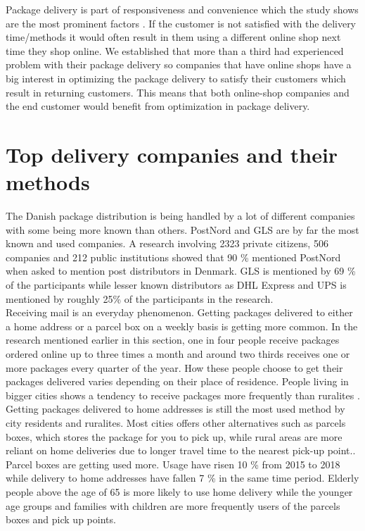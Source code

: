 \documentclass[12pt]{report}
\begin{document}
Package delivery is part of responsiveness and convenience which the study shows are the most prominent factors \cite{FDIHyearreport}. If the customer is not satisfied with the delivery time/methods it would often result in them using a different online shop next time they shop online. We established that more than a third had experienced problem with their package delivery so companies that have online shops have a big interest in optimizing the package delivery to satisfy their customers which result in returning customers. This means that both online-shop companies and the end customer would benefit from optimization in package delivery.



\section{Top delivery companies and their methods}
The Danish package distribution is being handled by a lot of different companies with some being more known than others. PostNord and GLS are by far the most known and used companies. A research involving 2323 private citizens, 506 companies and 212 public institutions showed that 90 \% mentioned PostNord when asked to mention post distributors in Denmark. GLS is mentioned by 69 \% of the participants while lesser known distributors as DHL Express and UPS is mentioned by roughly 25\% of the participants in the research\cite{reportDKpakketjenester}. \\\hspace*{5 mm}
Receiving mail is an everyday phenomenon. Getting packages delivered to either a home address or a parcel box on a weekly basis is getting more common. In the research mentioned earlier in this section, one in four people receive packages ordered online up to three times a month and around two thirds receives one or more packages every quarter of the year. How these people choose to get their packages delivered varies depending on their place of residence. People living in bigger cities shows a tendency to receive packages more frequently than ruralites \cite{reportDKpakketjenester}. Getting packages delivered to home addresses is still the most used method by city residents and ruralites. Most cities offers other alternatives such as parcels boxes, which stores the package for you to pick up, while rural areas are more reliant on home deliveries due to longer travel time to the nearest pick-up point.\cite{reportDKpakketjenester}.\\\hspace*{5 mm}
Parcel boxes are getting used more. Usage have risen 10 \% from 2015 to 2018 while delivery to home addresses have fallen 7 \% in the same time period. Elderly people above the age of 65 is more likely to use home delivery while the younger age groups and families with children are more frequently users of the parcels boxes and pick up points\cite{FDIHyearreport}.
\end{document}
